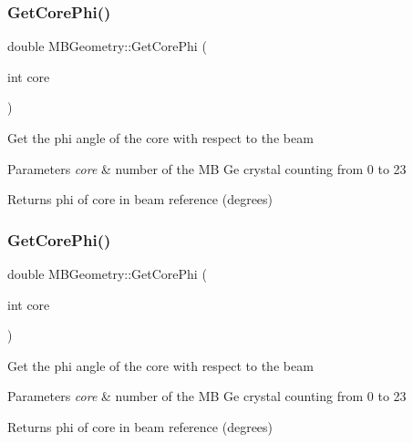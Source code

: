 \subsubsection{\texorpdfstring{Get\+Core\+Phi()}{GetCorePhi()}\hspace{0.1cm}{\footnotesize\ttfamily [1/2]}}
{\footnotesize\ttfamily double M\+B\+Geometry\+::\+Get\+Core\+Phi (\begin{DoxyParamCaption}\item[{int}]{core }\end{DoxyParamCaption})}

Get the phi angle of the core with respect to the beam 
\begin{DoxyParams}{Parameters}
{\em core} & number of the MB Ge crystal counting from 0 to 23 \\
\hline
\end{DoxyParams}
\begin{DoxyReturn}{Returns}
phi of core in beam reference (degrees) 
\end{DoxyReturn}
\mbox{\label{class_m_b_geometry_a39f685610ae0e68e547a46f8ef992599}} 
\subsubsection{\texorpdfstring{Get\+Core\+Phi()}{GetCorePhi()}\hspace{0.1cm}{\footnotesize\ttfamily [2/2]}}
{\footnotesize\ttfamily double M\+B\+Geometry\+::\+Get\+Core\+Phi (\begin{DoxyParamCaption}\item[{int}]{core }\end{DoxyParamCaption})}

Get the phi angle of the core with respect to the beam 
\begin{DoxyParams}{Parameters}
{\em core} & number of the MB Ge crystal counting from 0 to 23 \\
\hline
\end{DoxyParams}
\begin{DoxyReturn}{Returns}
phi of core in beam reference (degrees) 
\end{DoxyReturn}
\mbox{\label{class_m_b_geometry_a42aa536f15017724812712b0f8a77c12}} 
